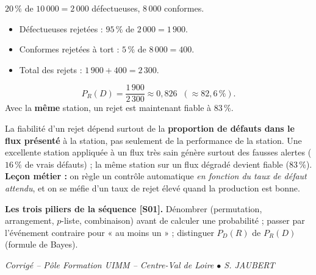 \documentclass[a4paper,11pt]{article}
\begin{document}
\begin{correction}
$20\,\%$ de $10\,000 = 2\,000$ défectueuses, $8\,000$ conformes.
\begin{itemize}
  \item Défectueuses rejetées : $95\,\%$ de $2\,000 = 1\,900$.
  \item Conformes rejetées à tort : $5\,\%$ de $8\,000 = 400$.
  \item Total des rejets : $1\,900 + 400 = 2\,300$.
\end{itemize}
\[
P_R(D) = \frac{1\,900}{2\,300} \approx 0{,}826 \;\; (\approx 82{,}6\,\%).
\]
Avec la \textbf{même} station, un rejet est maintenant fiable à $83\,\%$.
\end{correction}

\begin{correction}
La fiabilité d'un rejet dépend surtout de la \textbf{proportion de défauts dans le flux présenté} à la station, pas seulement de la performance de la station. Une excellente station appliquée à un flux très sain génère surtout des fausses alertes ($16\,\%$ de vrais défauts) ; la même station sur un flux dégradé devient fiable ($83\,\%$). \\
\textbf{Leçon métier :} on règle un contrôle automatique \emph{en fonction du taux de défaut attendu}, et on se méfie d'un taux de rejet élevé quand la production est bonne.
\end{correction}

\vfill
\begin{notion}
\textbf{Les trois piliers de la séquence [S01].} Dénombrer (permutation, arrangement, $p$-liste, combinaison) avant de calculer une probabilité ; passer par l'événement contraire pour « au moins un » ; distinguer $P_D(R)$ de $P_R(D)$ (formule de Bayes).
\end{notion}

\vspace{4pt}
\begin{center}
\color{uimmgray}\small
\textit{Corrigé -- Pôle Formation UIMM -- Centre-Val de Loire $\bullet$ S. JAUBERT}
\end{center}
\end{document}
